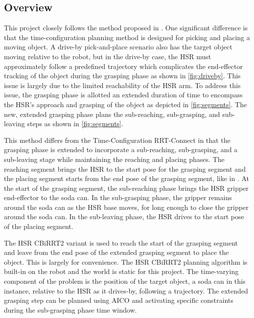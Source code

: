 \documentclass[11pt]{article}
\begin{document}
        \subsection{Overview}
            This project closely follows the method proposed in \cite{yang_planning_2018}. One significant difference is that the time-configuration planning method is designed for picking and placing a moving object. A drive-by pick-and-place scenario also has the target object moving relative to the robot, but in the drive-by case, the HSR must approximately follow a predefined trajectory which complicates the end-effector tracking of the object during the grasping phase as shown in \cref{fig:driveby}. This issue is largely due to the limited reachability of the HSR arm. To address this issue, the grasping phase is allotted an extended duration of time to encompass the HSR's approach and grasping of the object as depicted in \cref{fig:segments}. The new, extended grasping phase plans the sub-reaching, sub-grasping, and sub-leaving steps as shown in \cref{fig:segments}.

            \par This method differs from the Time-Configuration RRT-Connect in that the grasping phase is extended to incorporate a sub-reaching, sub-grasping, and a sub-leaving stage while maintaining the reaching and placing phases. The reaching segment brings the HSR to the start pose for the grasping segment and the placing segment starts from the end pose of the grasping segment, like in \cite{yang_planning_2018}. At the start of the grasping segment, the sub-reaching phase brings the HSR gripper end-effector to the soda can. In the sub-grasping phase, the gripper remains around the soda can as the HSR base moves, for long enough to close the gripper around the soda can. In the sub-leaving phase, the HSR drives to the start pose of the placing segment.

            \par The HSR CBiRRT2 variant is used to reach the start of the  grasping segment and leave from the end pose of the extended grasping segment to place the object. This is largely for convenience. The HSR CBiRRT2 planning algorithm is built-in on the robot and the world is static for this project. The time-varying component of the problem is the position of the target object, a soda can in this instance, relative to the HSR as it drives-by, following a trajectory. 
            The extended grasping step can be planned using AICO and activating specific constraints during the sub-grasping phase time window.
        
\end{document}
